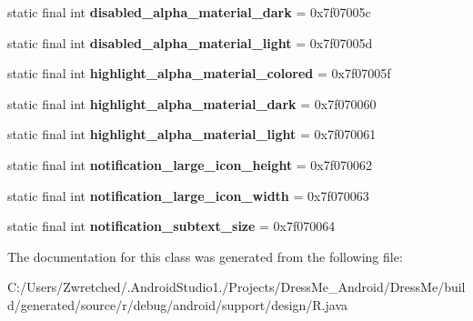 \begin{DoxyCompactItemize}
\item 
\hypertarget{classandroid_1_1support_1_1design_1_1_r_1_1dimen_abaf724b0a152c084b87b3a250eb9925e}{}static final int {\bfseries disabled\+\_\+alpha\+\_\+material\+\_\+dark} = 0x7f07005c\label{classandroid_1_1support_1_1design_1_1_r_1_1dimen_abaf724b0a152c084b87b3a250eb9925e}

\item 
\hypertarget{classandroid_1_1support_1_1design_1_1_r_1_1dimen_a5ff754097768daa1ae8597556ab0a5a5}{}static final int {\bfseries disabled\+\_\+alpha\+\_\+material\+\_\+light} = 0x7f07005d\label{classandroid_1_1support_1_1design_1_1_r_1_1dimen_a5ff754097768daa1ae8597556ab0a5a5}

\item 
\hypertarget{classandroid_1_1support_1_1design_1_1_r_1_1dimen_a844066f047b47ae2ef832ac7e8ece4c2}{}static final int {\bfseries highlight\+\_\+alpha\+\_\+material\+\_\+colored} = 0x7f07005f\label{classandroid_1_1support_1_1design_1_1_r_1_1dimen_a844066f047b47ae2ef832ac7e8ece4c2}

\item 
\hypertarget{classandroid_1_1support_1_1design_1_1_r_1_1dimen_ad4138b2c901c676ceb97b62ece7c5bad}{}static final int {\bfseries highlight\+\_\+alpha\+\_\+material\+\_\+dark} = 0x7f070060\label{classandroid_1_1support_1_1design_1_1_r_1_1dimen_ad4138b2c901c676ceb97b62ece7c5bad}

\item 
\hypertarget{classandroid_1_1support_1_1design_1_1_r_1_1dimen_aae4ec3504ac5846750b92f88579b6046}{}static final int {\bfseries highlight\+\_\+alpha\+\_\+material\+\_\+light} = 0x7f070061\label{classandroid_1_1support_1_1design_1_1_r_1_1dimen_aae4ec3504ac5846750b92f88579b6046}

\item 
\hypertarget{classandroid_1_1support_1_1design_1_1_r_1_1dimen_a6ad558115ac7ce4e1ce9a38b30aa6034}{}static final int {\bfseries notification\+\_\+large\+\_\+icon\+\_\+height} = 0x7f070062\label{classandroid_1_1support_1_1design_1_1_r_1_1dimen_a6ad558115ac7ce4e1ce9a38b30aa6034}

\item 
\hypertarget{classandroid_1_1support_1_1design_1_1_r_1_1dimen_acdf22e449222145bfdff5402ada49f70}{}static final int {\bfseries notification\+\_\+large\+\_\+icon\+\_\+width} = 0x7f070063\label{classandroid_1_1support_1_1design_1_1_r_1_1dimen_acdf22e449222145bfdff5402ada49f70}

\item 
\hypertarget{classandroid_1_1support_1_1design_1_1_r_1_1dimen_a971afa031fc61e3559e18f13f8d09792}{}static final int {\bfseries notification\+\_\+subtext\+\_\+size} = 0x7f070064\label{classandroid_1_1support_1_1design_1_1_r_1_1dimen_a971afa031fc61e3559e18f13f8d09792}

\end{DoxyCompactItemize}


The documentation for this class was generated from the following file\+:\begin{DoxyCompactItemize}
\item 
C\+:/\+Users/\+Zwretched/.\+Android\+Studio1./\+Projects/\+Dress\+Me\+\_\+\+Android/\+Dress\+Me/build/generated/source/r/debug/android/support/design/R.\+java\end{DoxyCompactItemize}
